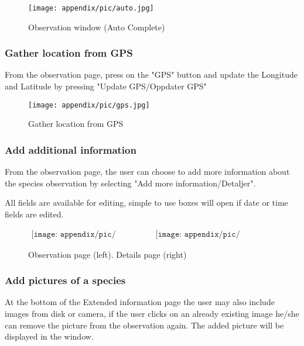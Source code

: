 \begin{figure}[h!]
\centering
 \texttt{[image: appendix/pic/auto.jpg]} 
 \caption{Observation window (Auto Complete)}
 \end{figure}



\pagebreak
\subsubsection{Gather location from GPS}
From the observation page, press on the "GPS" button and update the Longitude and Latitude by pressing "Update GPS/Oppdater GPS"

\begin{figure}[h!]
\centering
 \texttt{[image: appendix/pic/gps.jpg]} 
 \caption{Gather location from GPS}
 \end{figure}

\pagebreak

\subsubsection{Add additional information}
From the observation page, the user can choose to add more information about the species observation by selecting "Add more information/Detaljer".

All fields are available for editing, simple to use boxes will open if date or time fields are edited.

\begin{figure}[h!]
\centering
 \begin{center}$
 \begin{array}{cc}
 \texttt{[image: appendix/pic/det1.jpg]} &
 \texttt{[image: appendix/pic/det2.jpg]}
 \end{array}$
 \end{center}
 \caption{Observation page (left). Details page (right) }
 \end{figure}


\pagebreak


\subsubsection{Add pictures of a species}
At the bottom of the Extended information page the user may also include images from disk or camera, if the user clicks on an already existing image he/she can remove the picture from the observation again. The added picture will be displayed in the window.

